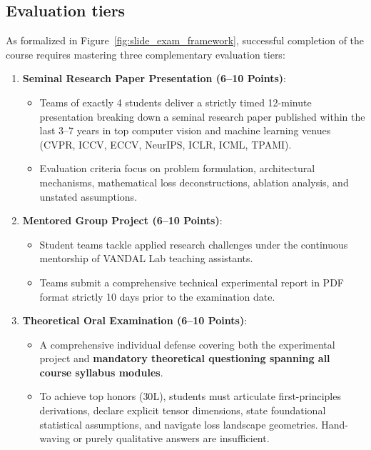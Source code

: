 \subsection{Evaluation tiers}
\label{sec:exam_evaluation_tiers}

As formalized in Figure~\ref{fig:slide_exam_framework}, successful completion of the course requires mastering three complementary evaluation tiers:
\begin{enumerate}
  \item \textbf{Seminal Research Paper Presentation (6--10 Points)}:
    \begin{itemize}[noitemsep]
      \item Teams of exactly 4 students deliver a strictly timed 12-minute presentation breaking down a seminal research paper published within the last 3--7 years in top computer vision and machine learning venues (CVPR, ICCV, ECCV, NeurIPS, ICLR, ICML, TPAMI).
      \item Evaluation criteria focus on problem formulation, architectural mechanisms, mathematical loss deconstructions, ablation analysis, and unstated assumptions.
    \end{itemize}
  \item \textbf{Mentored Group Project (6--10 Points)}:
    \begin{itemize}[noitemsep]
      \item Student teams tackle applied research challenges under the continuous mentorship of VANDAL Lab teaching assistants.
      \item Teams submit a comprehensive technical experimental report in PDF format strictly 10 days prior to the examination date.
    \end{itemize}
  \item \textbf{Theoretical Oral Examination (6--10 Points)}:
    \begin{itemize}[noitemsep]
      \item A comprehensive individual defense covering both the experimental project and \textbf{mandatory theoretical questioning spanning all course syllabus modules}.
      \item To achieve top honors ($30\text{L}$), students must articulate first-principles derivations, declare explicit tensor dimensions, state foundational statistical assumptions, and navigate loss landscape geometries. Hand-waving or purely qualitative answers are insufficient.
    \end{itemize}
\end{enumerate}

